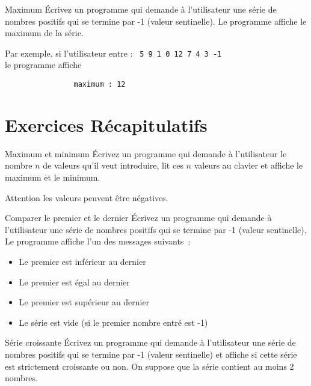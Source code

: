 \documentclass[a4paper,11pt]{style-esi/td}
\begin{document}
		\begin{Exercice}{Maximum}
			\'Ecrivez un programme qui demande à l'utilisateur une série de nombres positifs 
			qui se termine par -1 (valeur sentinelle). 
			Le programme affiche le maximum de la série.
			
			Par exemple, si l'utilisateur entre :			
			\texttt{ 5 9 1 0 12 7 4 3 -1}
			\\le programme affiche
			\begin{verbatim}
				maximum : 12
			\end{verbatim}
		\end{Exercice}

	\section{Exercices Récapitulatifs}

		\begin{Exercice}{Maximum et minimum}
			\'Ecrivez un programme qui demande à l'utilisateur le nombre $n$ de valeurs qu'il veut introduire,
			lit ces $n$ valeurs au clavier et affiche le maximum et le minimum. 
			
			Attention les valeurs peuvent être négatives.
		\end{Exercice}


		\begin{Exercice}{Comparer le premier et le dernier}
			\'Ecrivez un programme qui demande à l'utilisateur une série de nombres positifs 
			qui se termine par -1 (valeur sentinelle). 
			Le programme affiche l'un des messages suivants~:
			\begin{itemize}
				\item Le premier est inférieur au dernier
				\item Le premier est égal au dernier
				\item Le premier est supérieur au dernier
				\item Le série est vide (si le premier nombre entré est -1)
			\end{itemize}			
		\end{Exercice}

		\begin{Exercice}{Série croissante}
			\'Ecrivez un programme qui demande à l'utilisateur une série de nombres positifs 
			qui se termine par -1 (valeur sentinelle) et affiche si cette série est strictement croissante ou non.
			On suppose que la série contient au moins 2 nombres.
		\end{Exercice}
\end{document}
